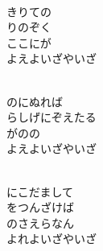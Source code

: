 \documentclass[10pt,b5j]{tarticle} %
\begin{document}
\vspace{1.5em} %
\newcommand{\linespace}{0.5em} %
\newcommand{\blocksize}{0.5\hsize} %
\newcommand{\itemmargin}{3em} %
\begin{enumerate} %
    \setlength{\itemindent}{\itemmargin} %
    \begin{minipage}[c]{\blocksize}
    
        \vspace{\linespace}
        \item~\\
        きりての\\
        りのぞく\\
        ここにが\\
        よえよいざやいざ
        
    \end{minipage}
    \begin{minipage}[c]{\blocksize}
        
        \vspace{\linespace}
        \item~\\
        のにぬれば\\
        らしげにぞえたる\\
        がのの\\
        よえよいざやいざ
        
    \end{minipage}
    \begin{minipage}[c]{\blocksize}
        
        \vspace{\linespace}
        \item~\\
        にこだまして\\
        をつんざけば\\
        のさえらなん\\
        よれよいざやいざ
        
    \end{minipage}
    \begin{minipage}[c]{\blocksize}
        

\end{minipage}
\end{enumerate}
\end{document}
